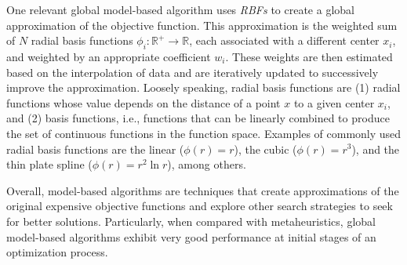 One relevant global model-based algorithm uses \textit{\acp{RBF}} to create a global approximation of the objective function. This approximation is the weighted sum of $N$ radial basis functions $\phi_i: \mathbb{R}^+ \to \mathbb{R}$, each associated with a different center $x_i$, and weighted by an appropriate coefficient $w_i$. These weights are then estimated based on the interpolation of data and are iteratively updated to successively improve the approximation. Loosely speaking, radial basis functions are (1) radial functions whose value depends on the distance of a point $x$ to a given center $x_i$, and (2) basis functions, i.e., functions that can be linearly combined to produce the set of continuous functions in the function space. Examples of commonly used radial basis functions are the linear ($\phi(r) = r$), the cubic ($\phi(r) = r^3$), and the thin plate spline ($\phi(r) = r^2 \ln r$), among others.

Overall, model-based algorithms are techniques that create approximations of the original expensive objective functions and explore other search strategies to seek for better solutions. Particularly, when compared with metaheuristics, global model-based algorithms exhibit very good performance at initial stages of an optimization process.